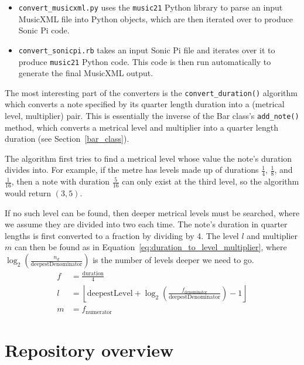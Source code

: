 \documentclass[12pt,twoside,openright]{report}
\begin{document}
\begin{itemize}
	\item \verb'convert_musicxml.py' uses the \verb'music21' Python library to parse an input MusicXML file into Python objects, which are then iterated over to produce Sonic Pi code.
	\item \verb'convert_sonicpi.rb' takes an input Sonic Pi file and iterates over it to produce \verb'music21' Python code. This code is then run automatically to generate the final MusicXML output.
\end{itemize}

The most interesting part of the converters is the \verb'convert_duration()' algorithm
which converts a note specified by its quarter length duration into a (metrical
level, multiplier) pair. This is essentially the inverse of the Bar class's
\verb'add_note()' method, which converts a metrical level and multiplier into a quarter length duration (see Section~\ref{bar_class}).

The algorithm first tries to find a metrical
level whose value the note's duration divides into. For example, if the metre
has levels made up of durations $\frac{1}{4}$, $\frac{1}{8}$, and $\frac{1}{16}$, then a note with duration $\frac{5}{16}$
can only exist at the third level, so the algorithm would return $(3,5)$.

If no
such level can be found, then deeper metrical levels must be searched, where we
assume they are divided into two each time. The note's duration in quarter
lengths is first converted to a fraction by dividing by 4. The level $l$ and
multiplier $m$ can then be found as in Equation~\ref{eq:duration_to_level_multiplier}, where $\log_2\left(\frac{n_d}{\mathrm{deepestDenominator}}\right)$ is the number of levels deeper we need to go.
\begin{equation}
    \begin{split}
        f &= \frac{\mathrm{duration}}{4} \\
        l &= \left\lfloor \mathrm{deepestLevel} + \log_2\left(\frac{f_\mathrm{denominator}}{\mathrm{deepestDenominator}}\right) - 1 \right\rfloor  \\
        m &= f_\mathrm{numerator}
    \end{split}
    \label{eq:duration_to_level_multiplier}
\end{equation}



\section{Repository overview} \label{repository}
\end{document}
